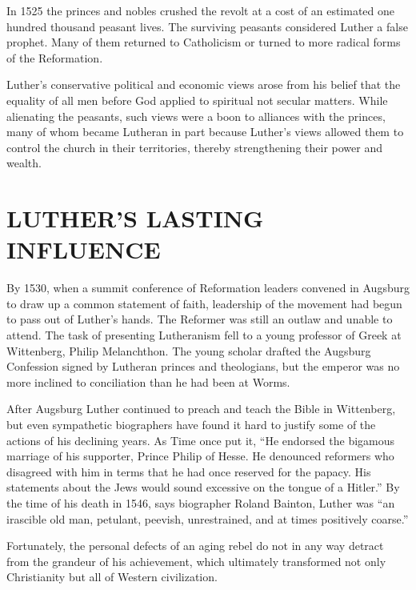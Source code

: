 In 1525 the princes and nobles crushed the revolt at a cost of an estimated one hundred thousand
peasant lives. The surviving peasants considered Luther a false prophet. Many of them returned to
Catholicism or turned to more radical forms of the Reformation.



Luther’s conservative political and economic views arose from his belief that the equality of all
men before God applied to spiritual not secular matters. While alienating the peasants, such views
were a boon to alliances with the princes, many of whom became Lutheran in part because Luther’s
views allowed them to control the church in their territories, thereby strengthening their power and
wealth.

\section{LUTHER’S LASTING INFLUENCE}

By 1530, when a summit conference of Reformation leaders convened in Augsburg to draw up a common
statement of faith, leadership of the movement had begun to pass out of Luther’s hands. The Reformer
was still an outlaw and unable to attend. The task of presenting Lutheranism fell to a young
professor of Greek at Wittenberg, Philip Melanchthon. The young scholar drafted the Augsburg
Confession signed by Lutheran princes and theologians, but the emperor was no more inclined to
conciliation than he had been at Worms.

After Augsburg Luther continued to preach and teach the Bible in Wittenberg, but even sympathetic
biographers have found it hard to justify some of the actions of his declining years. As Time once
put it, “He endorsed the bigamous marriage of his supporter, Prince Philip of Hesse. He denounced
reformers who disagreed with him in terms that he had once reserved for the papacy. His statements
about the Jews would sound excessive on the tongue of a Hitler.” By the time of his death in 1546,
says biographer Roland Bainton, Luther was “an irascible old man, petulant, peevish, unrestrained,
and at times positively coarse.”

Fortunately, the personal defects of an aging rebel do not in any way detract from the grandeur of
his achievement, which ultimately transformed not only Christianity but all of Western civilization.

